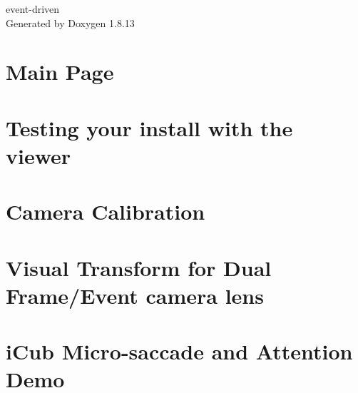 \documentclass[twoside]{book}
\newcommand{\+}{\discretionary{\mbox{\scriptsize$\hookleftarrow$}}{}{}}
\newcommand{\clearemptydoublepage}{%
  \newpage{\pagestyle{empty}\cleardoublepage}%
}
\begin{document}
\hypersetup{pageanchor=false,
             bookmarksnumbered=true,
             pdfencoding=unicode
            }
\begin{titlepage}
\vspace*{7cm}
\begin{center}%
{\Large event-\/driven }\\
\vspace*{1cm}
{\large Generated by Doxygen 1.8.13}\\
\end{center}
\end{titlepage}
\clearemptydoublepage
{}
\tableofcontents
\clearemptydoublepage
{}
\hypersetup{pageanchor=true}

\chapter{Main Page}
\label{index}\hypertarget{index}{}
\chapter{Testing your install with the viewer}
\label{md__media_workspace_projects_event-driven_documentation_1viewer}

\chapter{Camera Calibration}
\label{md__media_workspace_projects_event-driven_documentation_2calibration}

\chapter{Visual Transform for Dual Frame/\+Event camera lens}
\label{md__media_workspace_projects_event-driven_documentation_application_instructions_3a_8dualcam}

\chapter{i\+Cub Micro-\/saccade and Attention Demo}
\label{md__media_workspace_projects_event-driven_documentation_application_instructions_3b_8autosaccade}

\end{document}
